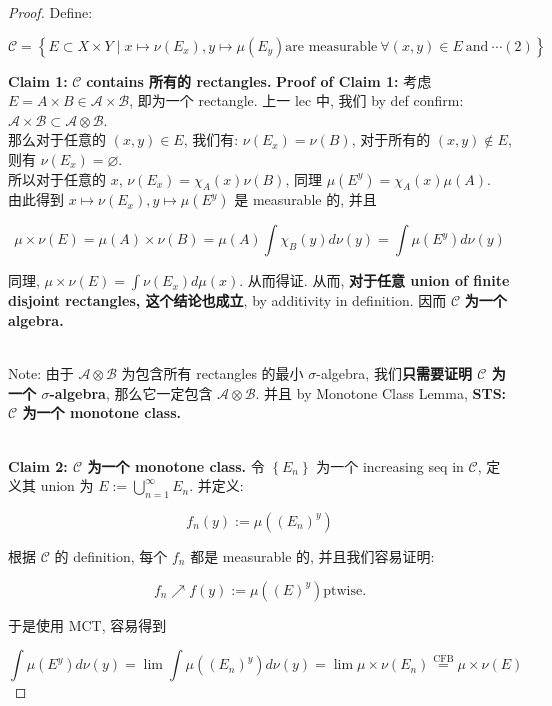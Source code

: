 \documentclass{qlnotes-export}
\begin{document}
\begin{proof}

Define:

\[\mathcal{C} = \left\{ {E \subset X \times Y \mid x\mapsto\nu(E_{x}),y\mapsto\mu(E_{y})\text{are measurable}\ \forall(x,y) \in E\ \text{and}\ \cdots(2)} \right\}\]

\textbf{Claim 1:} \(\mathcal{C}\) \textbf{contains 所有的 rectangles.} \textbf{Proof of Claim 1:} 考虑 \(E = A \times B \in \mathcal{A} \times \mathcal{B}\), 即为一个 rectangle. 上一 lec 中, 我们 by def confirm: \(\mathcal{A} \times \mathcal{B} \subset \mathcal{A} \otimes \mathcal{B}\).\\
那么对于任意的 \((x,y) \in E\), 我们有: \(\nu(E_{x}) = \nu(B)\), 对于所有的 \((x,y) \notin E\), 则有 \(\nu(E_{x}) = \varnothing\).\\
所以对于任意的 \(x\), \(\nu(E_{x}) = \chi_{A}(x)\nu(B)\), 同理 \(\mu(E^{y}) = \chi_{A}(x)\mu(A)\).\\
由此得到 \(x\mapsto\nu(E_{x}),y\mapsto\mu(E^{y})\) 是 measurable 的, 并且

\[\mu \times \nu(E) = \mu(A) \times \nu(B) = \mu(A)\int\chi_{B}(y) d\nu(y) = \int\mu(E^{y}) d\nu(y)\]

同理, \(\mu \times \nu(E) = \int\nu(E_{x}) d\mu(x)\). 从而得证. 从而, \textbf{对于任意 union of finite disjoint rectangles, 这个结论也成立}, by additivity in definition. 因而 \(\mathcal{C}\) \textbf{为一个 algebra.}\\
\strut \\
Note: 由于 \(\mathcal{A} \otimes \mathcal{B}\) 为包含所有 rectangles 的最小 \(\sigma\)-algebra, 我们\textbf{只需要证明 \(\mathcal{C}\) 为一个 \(\sigma\)-algebra}, 那么它一定包含 \(\mathcal{A} \otimes \mathcal{B}\). 并且 by Monotone Class Lemma, \textbf{STS: \(\mathcal{C}\) 为一个 monotone class.}\\
\strut \\
\textbf{Claim 2: \(\mathcal{C}\) 为一个 monotone class.} 令 \(\left\{ E_{n} \right\}\) 为一个 increasing seq in \(\mathcal{C}\), 定义其 union 为 \(E := \bigcup_{n = 1}^{\infty}E_{n}\). 并定义:

\[f_{n}(y) := \mu((E_{n})^{y})\]

根据 \(\mathcal{C}\) 的 definition, 每个 \(f_{n}\) 都是 measurable 的, 并且我们容易证明:

\[f_{n}\operatorname{\nearrow ︎}f(y) := \mu((E)^{y})\text{ptwise.}\]

于是使用 MCT, 容易得到

\[\int\mu(E^{y}) d\nu(y) = \lim\int\mu((E_{n})^{y}) d\nu(y) = \lim\mu \times \nu(E_{n})\overset{\text{CFB}}{=}\mu \times \nu(E)\]


\end{proof}
\end{document}
